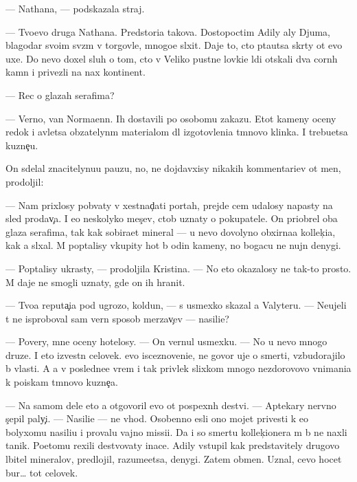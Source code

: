 \documentclass[10pt]{book}
\begin{document}
— Nathana, — podskazala straj.

— Tvo{\y}evo druga Nathana. Pred{\yi}stori{\y}a takova. Dostopoctim{\yi}{\y} Adily aly Djuma, blagodar{\ia} svo{\y}im sv{\ia}z{\ia}m v torgovle, mnogo{\y}e sl{\yi}xit. Daje to, cto p{\yi}ta{\y}utsa skr{\yi}ty ot {\y}evo uxe{\y}. Do nevo doxel sluh o tom, cto v Veliko{\y} pust{\yi}ne lovki{\y}e l{\iu}di ot{\yi}skali dva corn{\yi}h kamn{\ia} i privezli na nax kontinent.

— Rec o glazah serafima?

— Verno, van Normaenn. Ih dostavili po osobomu zakazu. Etot kameny oceny redok i {\y}avl{\ia}{\y}etsa ob{\ia}zatelyn{\yi}m materialom dl{\ia} izgotovleni{\y}a t{\e}mnovo klinka. I trebu{\y}etsa kuzne{\c}u.

On sdelal znacitelynu{\y}u pauzu, no, ne dojdavxisy nikakih kommentari{\y}ev ot men{\ia}, prodoljil:

— Nam prixlosy pob{\yi}vaty v xestnad{\c}ati portah, prejde cem udalosy napasty na sled prodav{\c}a. I {\y}e{\x}o neskolyko mes{\ia}{\c}ev, ctob{\yi} uznaty o pokupatele. On priobrel oba glaza serafima, tak kak sobira{\y}et mineral{\yi} — u nevo dovolyno obxirna{\y}a kollek{\c}i{\y}a, kak {\y}a sl{\yi}xal. M{\yi} pop{\yi}talisy v{\yi}kupity hot{\ia} b{\yi} odin kameny, no bogacu ne nujn{\yi} denygi.

— Pop{\yi}talisy ukrasty, — prodoljila Kristina. — No eto okazalosy ne tak-to prosto. M{\yi} daje ne smogli uznaty, gde on ih hranit.

— Tvo{\y}a reputa{\c}i{\y}a pod ugrozo{\y}, koldun, — s usmexko{\y} skazal {\y}a Valyteru. — Neujeli t{\yi} ne isproboval sam{\yi}{\y} vern{\yi}{\y} sposob merzav{\c}ev — nasili{\y}e?

— Povery, mne oceny hotelosy. — On vernul usmexku. — No u nevo mnogo druze{\y}. I eto izvestn{\yi}{\y} celovek. {\Y}evo isceznoveni{\y}e, ne govor{\ia} uje o smerti, vzbudorajilo b{\yi} vlasti. A {\y}a v posledne{\y}e vrem{\ia} i tak privlek slixkom mnogo nezdorovovo vnimani{\y}a k poiskam t{\e}mnovo kuzne{\c}a.

— Na samom dele eto {\y}a otgovoril {\y}evo ot pospexn{\yi}h de{\y}stvi{\y}. — Aptekary nervno s{\c}epil paly{\c}i. — Nasili{\y}e — ne v{\yi}hod. Osobenno {\y}esli ono mojet privesti k {\y}e{\x}o bolyxomu nasili{\y}u i provalu vajno{\y} missi{\y}i. Da i so smert{\y}u kollek{\c}ionera m{\yi} b{\yi} ne naxli ta{\y}nik. Poetomu rexili de{\y}stvovaty inace. Adily v{\yi}stupil kak predstavitely drugovo l{\iu}bitel{\ia} mineralov, predlojil, razume{\y}etsa, denygi. Zatem obmen. Uznal, cevo hocet bur… tot celovek.
\end{document}
